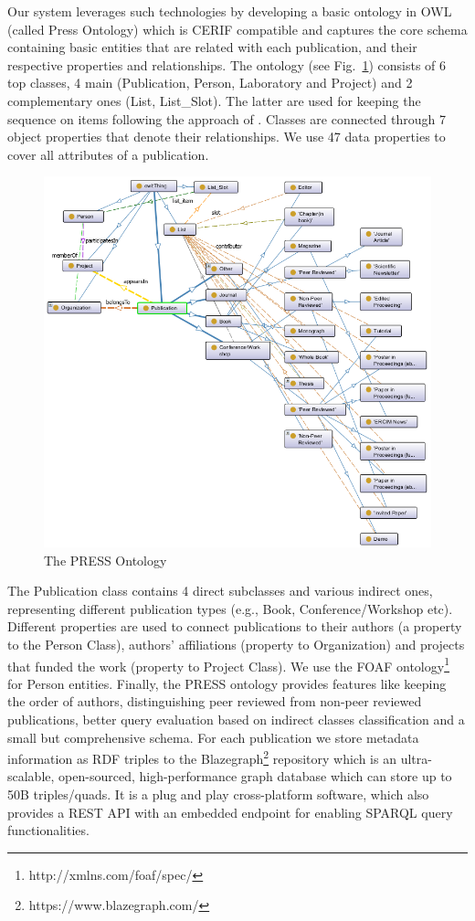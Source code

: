 \documentclass[runningheads,a4paper]{llncs}
\makeatletter
\def\maxwidth#1{\ifdim\Gin@nat@width>#1 #1\else\Gin@nat@width\fi}
\makeatother
\begin{document}
Our system leverages such technologies by developing a basic ontology in OWL (called Press Ontology) which is CERIF compatible and captures the core schema containing basic entities that are related with each publication, and their respective properties and relationships. The ontology (see Fig.~\ref{_Ref490663813}) consists of 6 top classes, 4 main (Publication, Person, Laboratory and Project) and 2 complementary ones (List, List\_Slot). The latter are used for keeping the sequence on items following the approach of  \cite{_Ref490663486}. Classes are connected through 7 object properties that denote their relationships. We use 47 data properties to cover all attributes of a publication.  
\begin{figure}[h!]
\centering
\includegraphics[width=\maxwidth{\textwidth}]{./img/image1.png}
\cprotect\caption{The PRESS Ontology}
\label{_Ref490663813}
\end{figure}


The Publication class contains 4 direct subclasses and various indirect ones, representing different publication types (e.g., Book, Conference/Workshop etc). Different properties are used to connect publications to their authors (a property to the Person Class), authors' affiliations (property to Organization) and projects that funded the work (property to Project Class). We use the FOAF ontology\footnote{ http://xmlns.com/foaf/spec/} for Person entities. Finally, the PRESS ontology provides features like keeping the order of authors, distinguishing peer reviewed from non-peer reviewed publications, better query evaluation based on indirect classes classification and a small but comprehensive schema. For each publication we store metadata information as RDF triples to the Blazegraph\footnote{ https://www.blazegraph.com/} repository which is an ultra-scalable, open-sourced, high-performance graph database which can store up to 50B triples/quads. It is a plug and play cross-platform software, which also provides a REST API with an embedded endpoint for enabling SPARQL query functionalities. 
\end{document}
